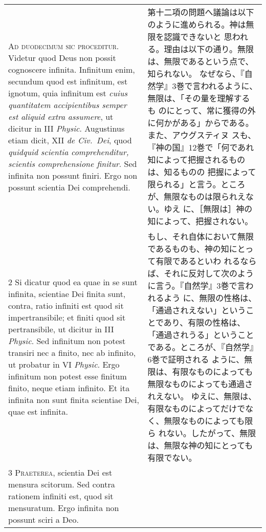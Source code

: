 \documentclass[10pt]{jsarticle} %
\begin{document}
\begin{longtable}{p{21em}p{21em}}

{\huge A}{\scshape d duodecimum sic proceditur}. Videtur quod Deus non
possit cognoscere infinita. Infinitum enim, secundum quod est
infinitum, est ignotum, quia infinitum est {\itshape cuius quantitatem
accipientibus semper est aliquid extra assumere}, ut dicitur in III
{\itshape Physic}. Augustinus etiam dicit, XII {\itshape de Civ.~Dei},
quod {\itshape quidquid scientia comprehenditur, scientis
comprehensione finitur}. Sed infinita non possunt finiri. Ergo non
possunt scientia Dei comprehendi.

&

第十二項の問題へ議論は以下のように進められる。神は無限を認識できないと
思われる。理由は以下の通り。無限は、無限であるという点で、知られない。
なぜなら、『自然学』3巻で言われるように、無限は、「その量を理解するも
のにとって、常に獲得の外に何かがある」からである。また、アウグスティヌ
スも、『神の国』12巻で「何であれ知によって把握されるものは、知るものの
把握によって限られる」と言う。ところが、無限なものは限られえない。ゆえ
に、［無限は］神の知によって、把握されない。


\\


2 Si dicatur quod ea quae in se sunt infinita, scientiae Dei finita
sunt, contra, ratio infiniti est quod sit impertransibile; et finiti
quod sit pertransibile, ut dicitur in III {\itshape Physic}. Sed
infinitum non potest transiri nec a finito, nec ab infinito, ut
probatur in VI {\itshape Physic}. Ergo infinitum non potest esse
finitum finito, neque etiam infinito. Et ita infinita non sunt finita
scientiae Dei, quae est infinita.

&

もし、それ自体において無限であるものも、神の知にとって有限であるといわ
れるならば、それに反対して次のように言う。『自然学』3巻で言われるよう
に、無限の性格は、「通過されえない」ということであり、有限の性格は、
「通過されうる」ということである。ところが、『自然学』6巻で証明される
ように、無限は、有限なものによっても無限なものによっても通過されえない。
ゆえに、無限は、有限なものによってだけでなく、無限なものによっても限ら
れない。したがって、無限は、無限な神の知にとっても有限でない。


\\


{\scshape 3 Praeterea}, scientia Dei est mensura scitorum. Sed contra
rationem infiniti est, quod sit mensuratum. Ergo infinita non possunt
sciri a Deo.



\end{longtable}
\end{document}

